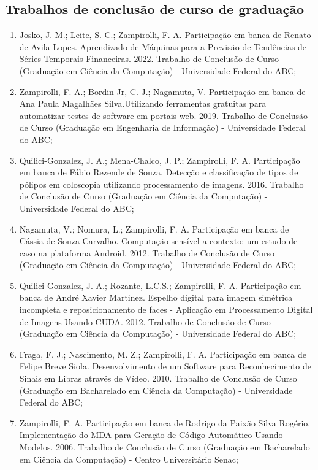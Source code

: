 \subsection{Trabalhos de conclusão de curso de graduação}

\begin{enumerate}
    \item Josko, J. M.; Leite, S. C.; Zampirolli, F. A. Participação em banca de Renato de Avila Lopes. Aprendizado de Máquinas para a Previsão de Tendências de Séries Temporais Financeiras. 2022. Trabalho de Conclusão de Curso (Graduação em Ciência da Computação) - Universidade Federal do ABC;
    \item Zampirolli, F. A.; Bordin Jr, C. J.; Nagamuta, V. Participação em banca de Ana Paula Magalhães Silva.Utilizando ferramentas gratuitas para automatizar testes de software em portais web. 2019. Trabalho de Conclusão de Curso (Graduação em Engenharia de Informação) - Universidade Federal do ABC;
    \item Quilici-Gonzalez, J. A.; Mena-Chalco, J. P.; Zampirolli, F. A. Participação em banca de Fábio Rezende de Souza. Detecção e classificação de tipos de pólipos em coloscopia utilizando processamento de imagens. 2016. Trabalho de Conclusão de Curso (Graduação em Ciência da Computação) - Universidade Federal do ABC;
    \item Nagamuta, V.; Nomura, L.; Zampirolli, F. A. Participação em banca de Cássia de Souza Carvalho. Computação sensível a contexto: um estudo de caso na plataforma Android. 2012. Trabalho de Conclusão de Curso (Graduação em Ciência da Computação) - Universidade Federal do ABC;
    \item Quilici-Gonzalez, J. A.; Rozante, L.C.S.; Zampirolli, F. A. Participação em banca de André Xavier Martinez. Espelho digital para imagem simétrica incompleta e reposicionamento de faces - Aplicação em Processamento Digital de Imagens Usando CUDA. 2012. Trabalho de Conclusão de Curso (Graduação em Ciência da Computação) - Universidade Federal do ABC;
    \item Fraga, F. J.; Nascimento, M. Z.; Zampirolli, F. A. Participação em banca de Felipe Breve Siola. Desenvolvimento de um Software para Reconhecimento de Sinais em Libras através de Vídeo. 2010. Trabalho de Conclusão de Curso (Graduação em Bacharelado em Ciência da Computação) - Universidade Federal do ABC;
    \item Zampirolli, F. A. Participação em banca de Rodrigo da Paixão Silva Rogério. Implementação do MDA para Geração de Código Automático Usando Modelos. 2006. Trabalho de Conclusão de Curso (Graduação em Bacharelado em Ciência da Computação) - Centro Universitário Senac;

\end{enumerate}

